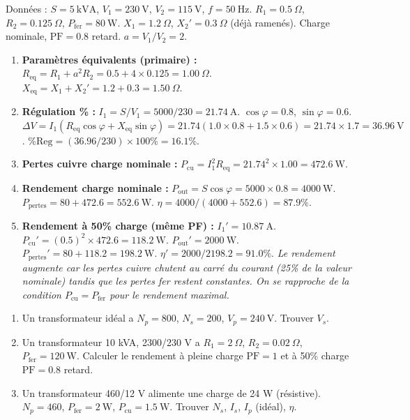 \documentclass[11pt]{article}
\begin{document}
\begin{exoresolu}
Données : $S=5\ \mathrm{kVA}$, $V_1=230\ \mathrm{V}$, $V_2=115\ \mathrm{V}$, $f=50\ \mathrm{Hz}$.
$R_1=0.5\ \Omega$, $R_2=0.125\ \Omega$, $P_{\mathrm{fer}}=80\ \mathrm{W}$.
$X_1=1.2\ \Omega$, $X_2'=0.3\ \Omega$ (déjà ramenés). Charge nominale, $\mathrm{PF}=0.8$ retard.
$a = V_1/V_2 = 2$.
\begin{enumerate}
\item \textbf{Paramètres équivalents (primaire) :}
$R_{\mathrm{eq}} = R_1 + a^2 R_2 = 0.5 + 4 \times 0.125 = 1.00\ \Omega$.
$X_{\mathrm{eq}} = X_1 + X_2' = 1.2 + 0.3 = 1.50\ \Omega$.
\item \textbf{Régulation \% :}
$I_1 = S/V_1 = 5000/230 = 21.74\ \mathrm{A}$.
$\cos\varphi=0.8$, $\sin\varphi=0.6$.
$\Delta V = I_1(R_{\mathrm{eq}}\cos\varphi + X_{\mathrm{eq}}\sin\varphi) = 21.74(1.0\times0.8 + 1.5\times0.6) = 21.74 \times 1.7 = 36.96\ \mathrm{V}$.
$\%\mathrm{Reg} = (36.96/230) \times 100\% = 16.1\%$.
\item \textbf{Pertes cuivre charge nominale :}
$P_{\mathrm{cu}} = I_1^2 R_{\mathrm{eq}} = 21.74^2 \times 1.00 = 472.6\ \mathrm{W}$.
\item \textbf{Rendement charge nominale :}
$P_{\mathrm{out}} = S\cos\varphi = 5000 \times 0.8 = 4000\ \mathrm{W}$.
$P_{\mathrm{pertes}} = 80 + 472.6 = 552.6\ \mathrm{W}$.
$\eta = 4000 / (4000 + 552.6) = 87.9\%$.
\item \textbf{Rendement à 50\% charge (même PF) :}
$I_1' = 10.87\ \mathrm{A}$. $P_{\mathrm{cu}}' = (0.5)^2 \times 472.6 = 118.2\ \mathrm{W}$.
$P_{\mathrm{out}}' = 2000\ \mathrm{W}$. $P_{\mathrm{pertes}}' = 80 + 118.2 = 198.2\ \mathrm{W}$.
$\eta' = 2000 / 2198.2 = 91.0\%$.
\textit{Le rendement augmente car les pertes cuivre chutent au carré du courant (25\% de la valeur nominale) tandis que les pertes fer restent constantes. On se rapproche de la condition $P_{\mathrm{cu}} = P_{\mathrm{fer}}$ pour le rendement maximal.}
\end{enumerate}
\end{exoresolu}

\begin{exercice}[Transformateurs]
\begin{enumerate}
\item Un transformateur idéal a $N_p=800$, $N_s=200$, $V_p=240\ \mathrm{V}$. Trouver $V_s$.
\item Un transformateur 10 kVA, 2300/230 V a $R_1=2\ \Omega$, $R_2=0.02\ \Omega$, $P_{\mathrm{fer}}=120\ \mathrm{W}$. Calculer le rendement à pleine charge $\mathrm{PF}=1$ et à 50\% charge $\mathrm{PF}=0.8$ retard.
\item Un transformateur 460/12 V alimente une charge de 24 W (résistive). $N_p=460$, $P_{\mathrm{fer}}=2\ \mathrm{W}$, $P_{\mathrm{cu}}=1.5\ \mathrm{W}$. Trouver $N_s$, $I_s$, $I_p$ (idéal), $\eta$.
\end{enumerate}
\end{exercice}
\end{document}
